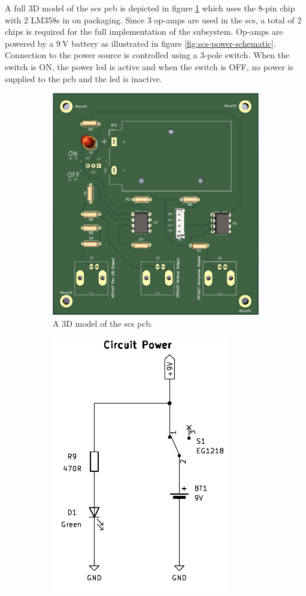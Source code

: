\documentclass[class=report,11pt,crop=false]{standalone}
\begin{document}
	A full 3D model of the \acrshort{scs} \acrshort{pcb} is depicted in figure \ref{fig:scs-pcb} which uses the 8-pin chip with 2 LM358s in on packaging. Since 3 op-amps are used in the \acrshort{scs}, a total of 2 chips is required for the full implementation of the subsystem. Op-amps are powered by a $\SI{9}{\volt}$ battery as illustrated in figure \ref{fig:scs-power-schematic}. Connection to the power source is controlled using a 3-pole switch. When the switch is ON, the power \acrshort{led} is active and when the switch is OFF, no power is supplied to the \acrshort{pcb} and the \acrshort{led} is inactive. 

	\begin{figure}[ht!]
		\centering
		\begin{subfigure}{.5\textwidth}
			\centering
			\includegraphics[width=0.7\linewidth]{Figures/Methodology/scs-pcb}
			\caption{A 3D model of the \acrshort{scs} \acrshort{pcb}.}
			\label{fig:scs-pcb}
		\end{subfigure}%
		\begin{subfigure}{.5\textwidth}
			\centering
			\includegraphics[width=0.57\linewidth]{Figures/Methodology/scs-power-schematic}

\end{subfigure}
\end{figure}
\end{document}
